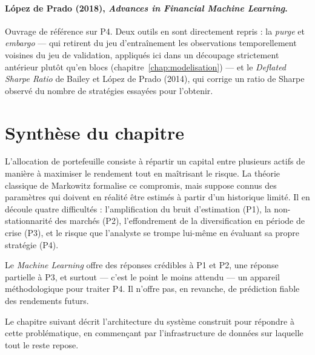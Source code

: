 \paragraph{López de Prado (2018), \emph{Advances in Financial Machine Learning}.}
Ouvrage de référence sur P4. Deux outils en sont directement repris : la
\emph{purge} et \emph{embargo} — qui retirent du jeu d'entraînement les
observations temporellement voisines du jeu de validation, appliqués ici dans un
découpage strictement antérieur plutôt qu'en blocs (chapitre~\ref{chap:modelisation})
— et le \emph{Deflated Sharpe Ratio} de Bailey et López de Prado (2014), qui corrige un ratio de Sharpe observé
du nombre de stratégies essayées pour l'obtenir.

\section*{Synthèse du chapitre}

L'allocation de portefeuille consiste à répartir un capital entre plusieurs
actifs de manière à maximiser le rendement tout en maîtrisant le risque. La
théorie classique de Markowitz formalise ce compromis, mais suppose connus des
paramètres qui doivent en réalité être estimés à partir d'un historique limité.
Il en découle quatre difficultés : l'amplification du bruit d'estimation (P1), la
non-stationnarité des marchés (P2), l'effondrement de la diversification en
période de crise (P3), et le risque que l'analyste se trompe lui-même en
évaluant sa propre stratégie (P4).

Le \emph{Machine Learning} offre des réponses crédibles à P1 et P2, une réponse
partielle à P3, et surtout — c'est le point le moins attendu — un appareil
méthodologique pour traiter P4. Il n'offre pas, en revanche, de prédiction fiable
des rendements futurs.

Le chapitre suivant décrit l'architecture du système construit pour répondre à
cette problématique, en commençant par l'infrastructure de données sur laquelle
tout le reste repose.
